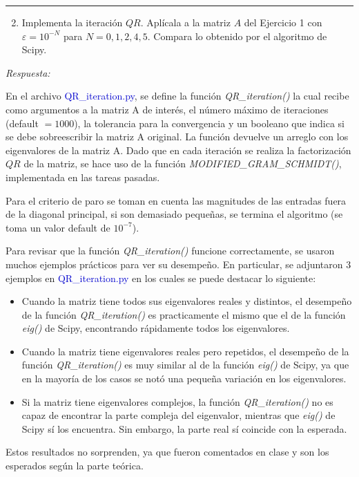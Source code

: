 \vspace{5mm}
{\color{lightgray} \hrule}
\begin{enumerate} \setcounter{enumi}{1}
	\item Implementa la iteración $QR$. Aplícala a la matriz $A$ del Ejercicio 1 con $\varepsilon=10^{-N}$ para $N = 0, 1, 2, 4, 5$. Compara lo obtenido por el algoritmo de Scipy.
\end{enumerate}

\textcolor{BrickRed}{\it Respuesta:}

En el archivo \textcolor{mediumblue}{QR\_iteration.py}, se define la función \textit{QR\_iteration()} la cual recibe como argumentos a la matriz A de interés, el número máximo de iteraciones (default $= 1000$), la tolerancia para la convergencia y un booleano que indica si se debe sobreescribir la matriz A original. La función devuelve un arreglo con los eigenvalores de la matriz A. Dado que en cada iteración se realiza la factorización $QR$ de la matriz, se hace uso de la función \textit{MODIFIED\_GRAM\_SCHMIDT()}, implementada en las tareas pasadas.

Para el criterio de paro se toman en cuenta las magnitudes de las entradas fuera de la diagonal principal, si son demasiado pequeñas, se termina el algoritmo (se toma un valor default de $10^{-7}$).

Para revisar que la función \textit{QR\_iteration()} funcione correctamente,  se usaron muchos ejemplos prácticos para ver su desempeño. En particular, se adjuntaron $3$ ejemplos en \textcolor{mediumblue}{QR\_iteration.py} en los cuales se puede destacar lo siguiente:
\begin{itemize}
	\item Cuando la matriz tiene todos sus eigenvalores reales y distintos, el desempeño de la función \textit{QR\_iteration()} es practicamente el mismo que el de la función \textit{eig()} de Scipy, encontrando rápidamente todos los eigenvalores.
	\item Cuando la matriz tiene eigenvalores reales pero repetidos, el desempeño de la función \textit{QR\_iteration()} es muy similar al de la función \textit{eig()} de Scipy, ya que en la mayoría de los casos se notó una pequeña variación en los eigenvalores.
	\item Si la matriz tiene eigenvalores complejos, la función \textit{QR\_iteration()} no es capaz de encontrar la parte compleja del eigenvalor, mientras que \textit{eig()} de Scipy sí los encuentra. Sin embargo, la parte real sí coincide con la esperada.
\end{itemize}
Estos resultados no sorprenden, ya que fueron comentados en clase y son los esperados según la parte teórica.

